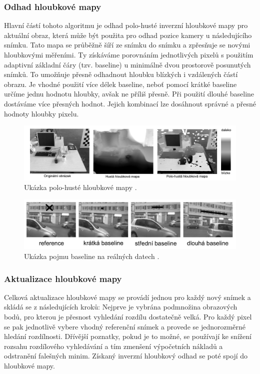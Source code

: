 \documentclass[12pt,a4paper]{article}
\begin{document}
\subsubsection*{Odhad hloubkové mapy}
Hlavní částí tohoto algoritmu je odhad polo-husté inverzní hloubkové mapy pro aktuální obraz, která může být použita pro odhad pozice kamery u následujícího snímku. Tato mapa se průběžně šíří ze snímku do snímku a zpřesňuje se novými hloubkovými měřeními. Ty získáváme porovnáním jednotlivých pixelů s použitím adaptivní základní čáry (tzv. baseline) u minimálně dvou prostorově posunutých snímků. To umožňuje přesně odhadnout hloubku blízkých i vzdálených částí obrazu. Je vhodné použití více délek baseline, neboť pomocí krátké baseline určíme jednu hodnotu hloubky, avšak ne příliš přesně. Při použití dlouhé baseline dostáváme více přesných hodnot. Jejich kombinací lze dosáhnout správné a přesné hodnoty hloubky pixelu.

\begin{figure}[H]
\centering
\includegraphics[scale=0.7]{img/hloubkova_mapa.jpg}
\caption{Ukázka polo-husté hloubkové mapy \cite{Semi-Dense_VO}.}
\end{figure}

\begin{figure}[H]
\centering
\includegraphics[scale=0.4]{img/baseline.jpg}
\caption{Ukázka pojmu baseline na reálných datech \cite{Semi-Dense_VO}.}
\end{figure}

\subsubsection*{Aktualizace hloubkové mapy}
Celková aktualizace hloubkové mapy se provádí jednou pro každý nový snímek a skládá se z následujících kroků: Nejprve je vybrána podmnožina obrazových bodů, pro kterou je přesnost vyhledání rozdílu dostatečně velká. Pro každý pixel se pak jednotlivě vybere vhodný referenční snímek a provede se jednorozměrné hledání rozdílnosti. Dřívější poznatky, pokud je to možné, se používají ke snížení rozsahu rozdílového vyhledávání a tím zmenšení výpočetních nákladů a odstranění falešných minim. Získaný inverzní hloubkový odhad se poté spojí do hloubkové mapy.
\end{document}
